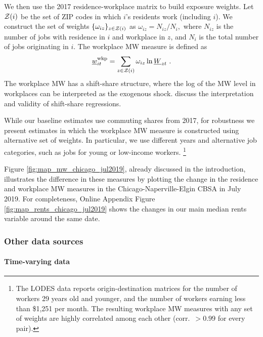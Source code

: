 We then use the 2017 residence-workplace matrix to build exposure 
weights.
Let $\mathcal{Z}(i)$ be the set of ZIP codes in which $i$'s residents work 
(including $i$).
We construct the set of weights $\{\omega_{iz}\}_{z\in\mathcal{Z}(i)}$ as 
$ \omega_{iz} = N_{iz}/{N_i} , $
where 
$N_{iz}$ is the number of jobs with residence in $i$ and workplace in $z$, 
and $N_i$ is the total number of jobs originating in $i$.
The workplace MW measure is defined as
\begin{equation*}\label{eq:mw_wkp_def}
    \mw^{\wkp}_{it} = \sum_{z\in\Z(i)} \omega_{iz} \ln \MW_{zt} \ .
\end{equation*}
The workplace MW has a shift-share structure, where the log of the MW level
in workplaces can be interpreted as the exogenous shock.
\textcite{BorusyakHullJaravel2021} discuss the interpretation and validity of 
shift-share regressions.
%
%

While our baseline estimates use commuting shares from 2017,
for robustness we present estimates in which the workplace MW measure
is constructed using alternative set of weights.
In particular, we use different years and alternative job categories,
such as jobs for young or low-income workers.%
\footnote{The LODES data reports origin-destination matrices for the number of 
	workers 29 years old and younger, and the number of workers earning less 
	than \$1,251 per month.
The resulting workplace MW measures with any set of weights are highly correlated 
among each other (corr.\ $>0.99$ for every pair).}

Figure \ref{fig:map_mw_chicago_jul2019}, already discussed in the introduction,
illustrates the difference in these measures by plotting the change in the 
residence and workplace MW measures in the Chicago-Naperville-Elgin CBSA in
July 2019.
For completeness, Online Appendix Figure \ref{fig:map_rents_chicago_jul2019} 
shows the changes in our main median rents variable around the same date.


\subsubsection{Other data sources}\label{sec:data_other}

\paragraph{Time-varying data}

